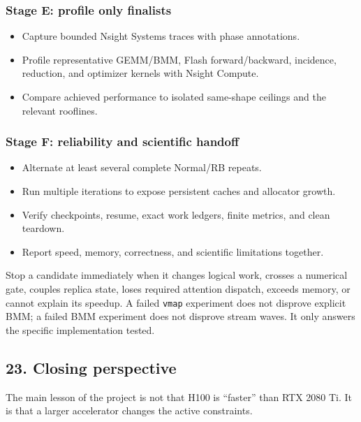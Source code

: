 \documentclass[
  10pt,
  letterpaper,
]{article}
\providecommand{\tightlist}{%
  \setlength{\itemsep}{0pt}\setlength{\parskip}{0pt}}
\begin{document}
\subsubsection{Stage E: profile only
finalists}\label{stage-e-profile-only-finalists}

\begin{itemize}
\tightlist
\item
  Capture bounded Nsight Systems traces with phase annotations.
\item
  Profile representative GEMM/BMM, Flash forward/backward, incidence,
  reduction, and optimizer kernels with Nsight Compute.
\item
  Compare achieved performance to isolated same-shape ceilings and the
  relevant rooflines.
\end{itemize}

\subsubsection{Stage F: reliability and scientific
handoff}\label{stage-f-reliability-and-scientific-handoff}

\begin{itemize}
\tightlist
\item
  Alternate at least several complete Normal/RB repeats.
\item
  Run multiple iterations to expose persistent caches and allocator
  growth.
\item
  Verify checkpoints, resume, exact work ledgers, finite metrics, and
  clean teardown.
\item
  Report speed, memory, correctness, and scientific limitations
  together.
\end{itemize}

Stop a candidate immediately when it changes logical work, crosses a
numerical gate, couples replica state, loses required attention
dispatch, exceeds memory, or cannot explain its speedup. A failed
\texttt{vmap} experiment does not disprove explicit BMM; a failed BMM
experiment does not disprove stream waves. It only answers the specific
implementation tested.

\subsection{23. Closing perspective}\label{23-closing-perspective}

The main lesson of the project is not that H100 is ``faster'' than RTX
2080 Ti. It is that a larger accelerator changes the active constraints.
\end{document}
